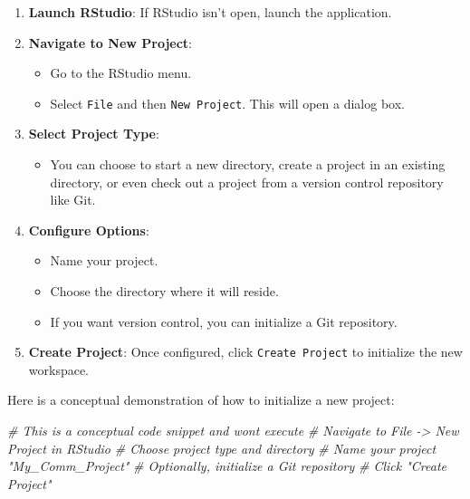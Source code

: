 \documentclass[
  b5paper]{book}
\newenvironment{Shaded}{\begin{snugshade}}{\end{snugshade}}
\newcommand{\CommentTok}[1]{\textcolor[rgb]{0.56,0.35,0.01}{\textit{#1}}}
\providecommand{\tightlist}{%
  \setlength{\itemsep}{0pt}\setlength{\parskip}{0pt}}
\begin{document}
\begin{enumerate}
\def\labelenumi{\arabic{enumi}.}
\item
  \textbf{Launch RStudio}: If RStudio isn't open, launch the application.
\item
  \textbf{Navigate to New Project}:

  \begin{itemize}
  \tightlist
  \item
    Go to the RStudio menu.
  \item
    Select \texttt{File} and then \texttt{New\ Project}. This will open a dialog box.
  \end{itemize}
\item
  \textbf{Select Project Type}:

  \begin{itemize}
  \tightlist
  \item
    You can choose to start a new directory, create a project in an existing directory, or even check out a project from a version control repository like Git.
  \end{itemize}
\item
  \textbf{Configure Options}:

  \begin{itemize}
  \tightlist
  \item
    Name your project.
  \item
    Choose the directory where it will reside.
  \item
    If you want version control, you can initialize a Git repository.
  \end{itemize}
\item
  \textbf{Create Project}: Once configured, click \texttt{Create\ Project} to initialize the new workspace.
\end{enumerate}

Here is a conceptual demonstration of how to initialize a new project:

\begin{Shaded}
\begin{Highlighting}[]
\CommentTok{\# This is a conceptual code snippet and won\textquotesingle{}t execute}
\CommentTok{\# Navigate to File {-}\textgreater{} New Project in RStudio}
\CommentTok{\# Choose project type and directory}
\CommentTok{\# Name your project "My\_Comm\_Project"}
\CommentTok{\# Optionally, initialize a Git repository}
\CommentTok{\# Click "Create Project"}
\end{Highlighting}
\end{Shaded}
\end{document}
